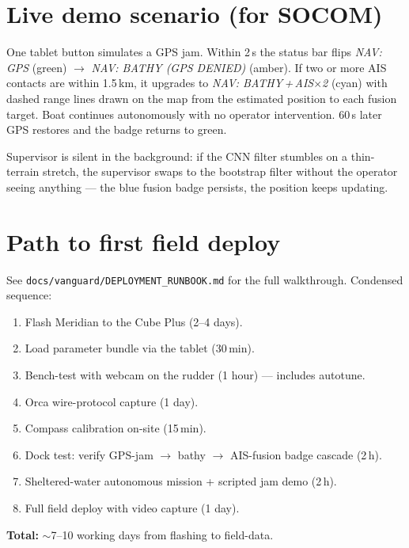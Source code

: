 \documentclass[10pt,a4paper]{article}
\begin{document}
\section{Live demo scenario (for SOCOM)}
One tablet button simulates a GPS jam. Within 2\,s the status bar flips
\textit{NAV: GPS} (green) $\to$ \textit{NAV: BATHY (GPS DENIED)} (amber).
If two or more AIS contacts are within 1.5\,km, it upgrades to
\textit{NAV: BATHY\,+\,AIS$\times$2} (cyan) with dashed range lines
drawn on the map from the estimated position to each fusion target.
Boat continues autonomously with no operator intervention. 60\,s later
GPS restores and the badge returns to green.

Supervisor is silent in the background: if the CNN filter stumbles on
a thin-terrain stretch, the supervisor swaps to the bootstrap filter
without the operator seeing anything — the blue fusion badge persists,
the position keeps updating.

\section{Path to first field deploy}
See \texttt{docs/vanguard/DEPLOYMENT\_RUNBOOK.md} for the full walkthrough.
Condensed sequence:
\begin{enumerate}[leftmargin=*, itemsep=3pt]
\item Flash Meridian to the Cube Plus (2--4 days).
\item Load parameter bundle via the tablet (30\,min).
\item Bench-test with webcam on the rudder (1 hour) — includes autotune.
\item Orca wire-protocol capture (1 day).
\item Compass calibration on-site (15\,min).
\item Dock test: verify GPS-jam $\to$ bathy $\to$ AIS-fusion badge cascade (2\,h).
\item Sheltered-water autonomous mission + scripted jam demo (2\,h).
\item Full field deploy with video capture (1 day).
\end{enumerate}
\textbf{Total:} $\sim$7--10 working days from flashing to field-data.
\end{document}
